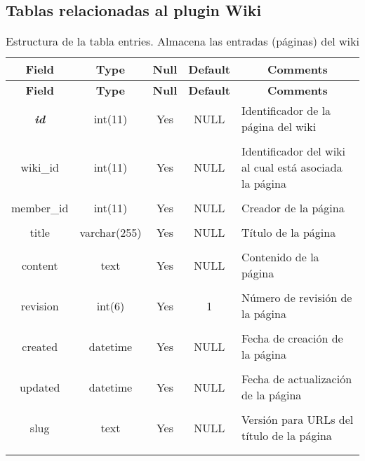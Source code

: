 \subsection{Tablas relacionadas al plugin Wiki}
%
%
\begin{longtable}{c c c c l}
	\multicolumn{1}{c}{\textbf{Field}} &
	\multicolumn{1}{c}{\textbf{Type}} &
	\multicolumn{1}{c}{\textbf{Null}} &
	\multicolumn{1}{c}{\textbf{Default}} &
	\multicolumn{1}{c}{\textbf{Comments}} \\ \hline \hline
\endfirsthead
	\multicolumn{1}{c}{\textbf{Field}} &
	\multicolumn{1}{c}{\textbf{Type}} &
	\multicolumn{1}{c}{\textbf{Null}} &
	\multicolumn{1}{c}{\textbf{Default}} &
	\multicolumn{1}{c}{\textbf{Comments}} \\ \hline \hline
\endhead \endfoot
	\textbf{\textit{id}} & int(11) & Yes & NULL & \parbox[t]{0.35\textwidth}{Identificador de la página del wiki} \\ \\  \hline
	wiki\_id & int(11) & Yes & NULL & \parbox[t]{0.35\textwidth}{Identificador del wiki al cual está asociada la página} \\ \\  \hline
	member\_id & int(11) & Yes & NULL & \parbox[t]{0.35\textwidth}{Creador de la página} \\ \\  \hline
	title & varchar(255) & Yes & NULL & \parbox[t]{0.35\textwidth}{Título de la página} \\ \\  \hline
	content & text & Yes & NULL & \parbox[t]{0.35\textwidth}{Contenido de la página} \\ \\  \hline
	revision & int(6) & Yes & 1 & \parbox[t]{0.35\textwidth}{Número de revisión de la página} \\ \\  \hline
	created & datetime & Yes & NULL & \parbox[t]{0.35\textwidth}{Fecha de creación de la página} \\ \\  \hline
	updated & datetime & Yes & NULL & \parbox[t]{0.35\textwidth}{Fecha de actualización de la página} \\ \\  \hline
	slug & text & Yes & NULL & \parbox[t]{0.35\textwidth}{Versión para URLs del título de la página} \\ \\
 \caption[Estructura de la tabla entries]{Estructura de la tabla entries. Almacena las entradas (páginas) del wiki} \label{tab:wiki_entries-structure} \\ 
\end{longtable}


